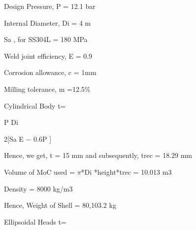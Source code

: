 \documentclass[a4paper,portrait,12pt]{article}
\begin{document}
\begin{flushleft}
Design Pressure, P = 12.1 bar
\end{flushleft}


\begin{flushleft}
Internal Diameter, Di = 4 m
\end{flushleft}


\begin{flushleft}
Sa , for SS304L = 180 MPa
\end{flushleft}


\begin{flushleft}
Weld joint efficiency, E = 0.9
\end{flushleft}


\begin{flushleft}
Corrosion allowance, c = 1mm
\end{flushleft}


\begin{flushleft}
Milling tolerance, m =12.5\%
\end{flushleft}


\begin{flushleft}
Cylindrical Body t=
\end{flushleft}





\begin{flushleft}
P Di
\end{flushleft}


\begin{flushleft}
2[Sa E $-$ 0.6P ]
\end{flushleft}





\begin{flushleft}
Hence, we get, t = 15 mm and subsequently, trec = 18.29 mm
\end{flushleft}


\begin{flushleft}
Volume of MoC used = $\pi$*Di *height*trec = 10.013 m3
\end{flushleft}


\begin{flushleft}
Density = 8000 kg/m3
\end{flushleft}


\begin{flushleft}
Hence, Weight of Shell = 80,103.2 kg
\end{flushleft}


\begin{flushleft}
Ellipsoidal Heads t=
\end{flushleft}
\end{document}
